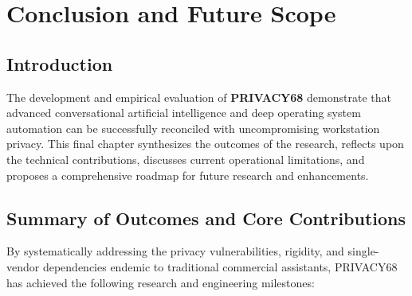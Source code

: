 \chapter{Conclusion and Future Scope}
\label{ch:conclusion}

\section{Introduction}
The development and empirical evaluation of \textbf{PRIVACY68} demonstrate that advanced conversational artificial intelligence and deep operating system automation can be successfully reconciled with uncompromising workstation privacy. This final chapter synthesizes the outcomes of the research, reflects upon the technical contributions, discusses current operational limitations, and proposes a comprehensive roadmap for future research and enhancements.

\section{Summary of Outcomes and Core Contributions}
By systematically addressing the privacy vulnerabilities, rigidity, and single-vendor dependencies endemic to traditional commercial assistants, PRIVACY68 has achieved the following research and engineering milestones:


